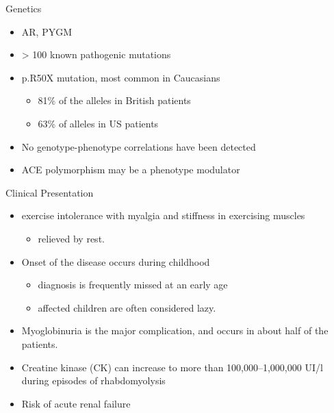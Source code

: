 \documentclass[presentation, smaller]{beamer}
\begin{document}
\begin{frame}[label={sec:org78bb3a4}]{Genetics}
\begin{itemize}
\item AR, PYGM
\item \textgreater{} 100 known pathogenic mutations
\item p.R50X mutation, most common in Caucasians
\begin{itemize}
\item 81\% of the alleles in British patients
\item 63\% of alleles in US patients
\end{itemize}
\item No genotype-phenotype correlations have been detected
\item ACE polymorphism may be a phenotype modulator
\end{itemize}
\end{frame}

\begin{frame}[label={sec:org4eaa41d}]{Clinical Presentation}
\begin{itemize}
\item exercise intolerance with myalgia and stiffness in exercising muscles
\begin{itemize}
\item relieved by rest.
\end{itemize}
\item Onset of the disease occurs during childhood
\begin{itemize}
\item diagnosis is frequently missed at an early age
\item affected children are often considered lazy.
\end{itemize}
\item Myoglobinuria is the major complication, and occurs in about half of
the patients.
\item Creatine kinase (CK) can increase to more than 100,000–1,000,000
UI/l during episodes of rhabdomyolysis
\item Risk of acute renal failure
\end{itemize}
\end{frame}
\end{document}
